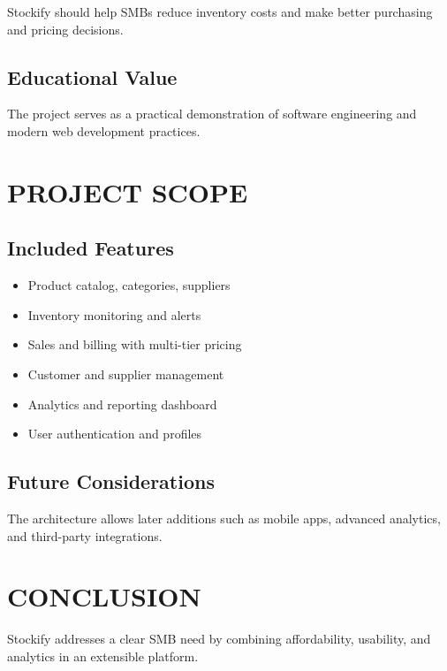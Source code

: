 Stockify should help SMBs reduce inventory costs and make better purchasing and pricing decisions.

\subsection{Educational Value}

The project serves as a practical demonstration of software engineering and modern web development practices.

\section{PROJECT SCOPE}

\subsection{Included Features}
\begin{itemize}
\item Product catalog, categories, suppliers
\item Inventory monitoring and alerts
\item Sales and billing with multi-tier pricing
\item Customer and supplier management
\item Analytics and reporting dashboard
\item User authentication and profiles
\end{itemize}

\subsection{Future Considerations}

The architecture allows later additions such as mobile apps, advanced analytics, and third-party integrations.

\section{CONCLUSION}

Stockify addresses a clear SMB need by combining affordability, usability, and analytics in an extensible platform.